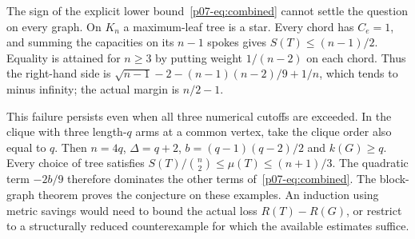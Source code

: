 \documentclass[11pt,a4paper]{article}
\begin{document}
The sign of the explicit lower bound~\eqref{p07-eq:combined} cannot settle
the question on every graph. On $K_n$ a maximum-leaf tree is a star.
Every chord has $C_e=1$, and summing the capacities on its $n-1$ spokes
gives $S(T)\le(n-1)/2$. Equality is attained for $n\ge3$ by putting
weight $1/(n-2)$ on each chord. Thus the right-hand side is
$\sqrt{n-1}-2-(n-1)(n-2)/9+1/n$, which tends to minus infinity;
the actual margin is $n/2-1$.

This failure persists even when all three numerical cutoffs are exceeded.
In the clique with three length-$q$ arms at a common vertex, take the
clique order also equal to $q$. Then $n=4q$, $\Delta=q+2$,
$b=(q-1)(q-2)/2$ and $k(G)\ge q$. Every choice of tree satisfies
$S(T)/\binom n2\le\mu(T)\le(n+1)/3$. The quadratic term $-2b/9$
therefore dominates the other terms of~\eqref{p07-eq:combined}. The block-graph
theorem proves the conjecture on these examples. An induction using metric
savings would need to bound the actual loss $R(T)-R(G)$, or restrict to a
structurally reduced counterexample for which the available estimates suffice.
\end{document}
